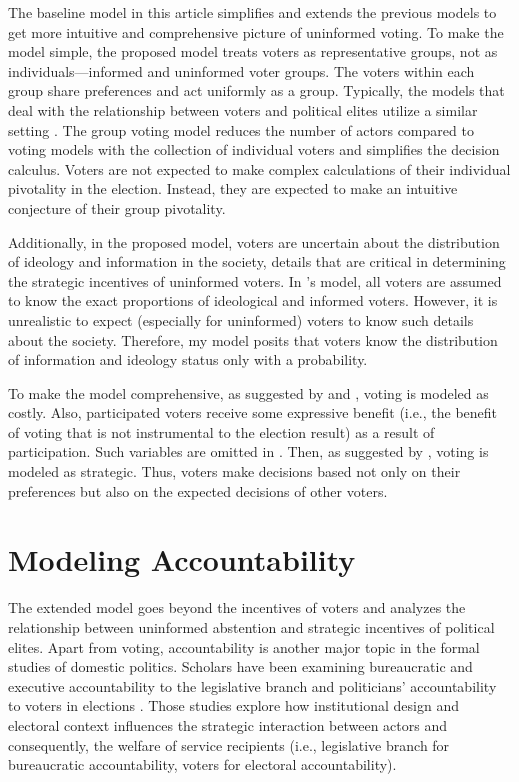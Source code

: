 \documentclass[letterpaper, 12pt]{article}
\begin{document}
    \par The baseline model in this article simplifies and extends the previous models to get more intuitive and comprehensive picture of uninformed voting. To make the model simple, the proposed model treats voters as representative groups, not as individuals---informed and uninformed voter groups. The voters within each group share preferences and act uniformly as a group. Typically, the models that deal with the relationship between voters and political elites utilize a similar setting \citep[e.g.,][]{Little2015pran}. The group voting model reduces the number of actors compared to voting models with the collection of individual voters and simplifies the decision calculus. Voters are not expected to make complex calculations of their individual pivotality in the election. Instead, they are expected to make an intuitive conjecture of their group pivotality.
    
    \par Additionally, in the proposed model, voters are uncertain about the distribution of ideology and information in the society, details that are critical in determining the strategic incentives of uninformed voters. In \citeauthor{Feddersen1996thsw}'s model, all voters are assumed to know the exact proportions of ideological and informed voters. However, it is unrealistic to expect (especially for uninformed) voters to know such details about the society. Therefore, my model posits that voters know the distribution of information and ideology status only with a probability.
    
    \par To make the model comprehensive, as suggested by \cite{Downs1957anec} and \cite{Riker1968thof}, voting is modeled as costly. Also, participated voters receive some expressive benefit (i.e., the benefit of voting that is not instrumental to the election result) as a result of participation. Such variables are omitted in \cite{Feddersen1996thsw, Feddersen1999abin}. Then, as suggested by \cite{Feddersen1996thsw}, voting is modeled as strategic. Thus, voters make decisions based not only on their preferences but also on the expected decisions of other voters.
    
    \section*{Modeling Accountability}

    \par The extended model goes beyond the incentives of voters and analyzes the relationship between uninformed abstention and strategic incentives of political elites. Apart from voting, accountability is another major topic in the formal studies of domestic politics. Scholars have been examining bureaucratic and executive accountability to the legislative branch \citep[e.g.,][]{Gailmard2013lewh} and politicians' accountability to voters in elections \citep[e.g.,][]{Ashworth2012elac}. Those studies explore how
    institutional design and electoral context influences the strategic interaction between actors and consequently, the welfare of service recipients (i.e., legislative branch for bureaucratic accountability, voters for electoral accountability).
    
\end{document}
